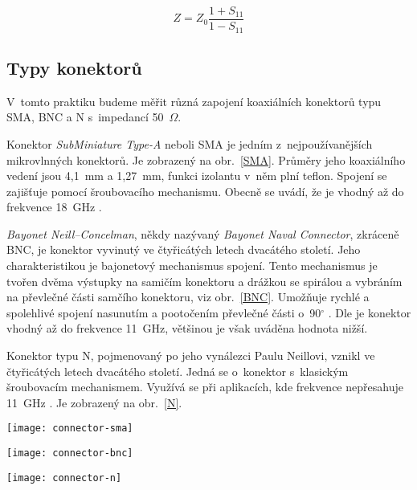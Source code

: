 \documentclass{protokol}
\newcommand\sparam{S}
\newcommand\impedance{Z}
\begin{document}
\begin{equation}
	\impedance = \impedance_{0}\frac{1+\sparam_{11}}{1-\sparam_{11}}
	\label{eq:Z}
\end{equation}


\subsection{Typy konektorů}
V~tomto praktiku budeme měřit různá zapojení koaxiálních konektorů typu
SMA, BNC a N s~impedancí 50~$\Omega$.

Konektor \emph{SubMiniature Type-A} neboli SMA je jedním z~nejpoužívanějších
mikrovlnných konektorů. Je zobrazený na obr.~\ref{SMA}.
Průměry jeho koaxiálního vedení jsou 4,1~mm a 1,27~mm,
funkci izolantu v~něm plní teflon.
Spojení se zajišťuje pomocí šroubovacího mechanismu.
Obecně se uvádí, že je vhodný až do frekvence 18~GHz \cite{rfhandbook}.

\emph{Bayonet Neill--Concelman}, někdy nazývaný \emph{Bayonet Naval Connector},
zkráceně BNC, je konektor vyvinutý ve čtyřicátých letech dvacátého století.
Jeho charakteristikou je bajonetový mechanismus spojení.
Tento mechanismus je tvořen dvěma výstupky na samičím konektoru
a drážkou se spirálou a vybráním na převlečné části samčího konektoru,
viz obr.~\ref{BNC}.
Umožňuje rychlé a spolehlivé spojení nasunutím a pootočením převlečné
části o~90$^{\circ}$ \cite{czwiki}.
Dle \cite{rfhandbook} je konektor vhodný až do frekvence 11~GHz,
většinou je však uváděna hodnota nižší.

Konektor typu N, pojmenovaný po jeho vynálezci Paulu Neillovi,
vznikl ve čtyřicátých letech dvacátého století.
Jedná se o~konektor s~klasickým šroubovacím mechanismem.
Využívá se při aplikacích, kde frekvence nepřesahuje 11~GHz \cite{rfhandbook}.
Je zobrazený na obr.~\ref{N}.

\begin{center}
	\captionsetup{justification=centering}
	\begin{minipage}{0.32\textwidth}
		\texttt{[image: connector-sma]}
		\label{SMA}
	\end{minipage}
	\begin{minipage}{0.40\linewidth}
		\texttt{[image: connector-bnc]}
		\label{BNC}
	\end{minipage}
	\begin{minipage}{0.29\textwidth}
		\texttt{[image: connector-n]}
		\label{N}
	\end{minipage}
\end{center}
\end{document}
